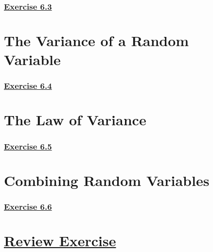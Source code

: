 \documentclass[
  11pt,
]{book}
\begin{document}
\subsubsection*{\texorpdfstring{\hyperref[ex63a]{Exercise 6.3}}{Exercise 6.3}}\label{exercise-6.3}

\section{The Variance of a Random Variable}\label{the-variance-of-a-random-variable}

\subsubsection*{\texorpdfstring{\hyperref[ex64a]{Exercise 6.4}}{Exercise 6.4}}\label{exercise-6.4}

\section{The Law of Variance}\label{the-law-of-variance}

\subsubsection*{\texorpdfstring{\hyperref[ex65a]{Exercise 6.5}}{Exercise 6.5}}\label{exercise-6.5}

\section{Combining Random Variables}\label{combining-random-variables}

\subsubsection*{\texorpdfstring{\hyperref[ex66a]{Exercise 6.6}}{Exercise 6.6}}\label{exercise-6.6}

\section*{\texorpdfstring{\hyperref[re6a]{Review Exercise}}{Review Exercise}}\label{review-exercise-5}
\end{document}
